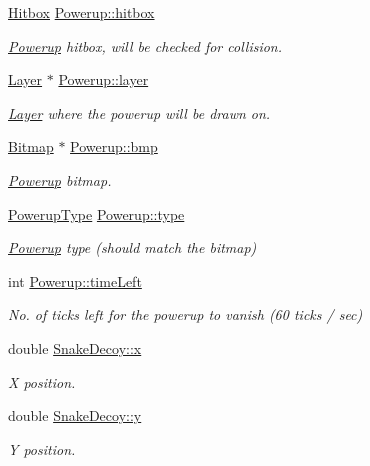 \begin{DoxyCompactItemize}
\mbox{\hyperlink{struct_hitbox}{Hitbox}} \mbox{\hyperlink{group__snake_ga0ec1e0954c1802c16b49ff5833146f32}{Powerup\+::hitbox}}
\begin{DoxyCompactList}\small\item\em \mbox{\hyperlink{struct_powerup}{Powerup}} hitbox, will be checked for collision. \end{DoxyCompactList}\item 
\mbox{\hyperlink{struct_layer}{Layer}} $\ast$ \mbox{\hyperlink{group__snake_ga02754983ce605c249985e650d5023797}{Powerup\+::layer}}
\begin{DoxyCompactList}\small\item\em \mbox{\hyperlink{struct_layer}{Layer}} where the powerup will be drawn on. \end{DoxyCompactList}\item 
\mbox{\hyperlink{struct_bitmap}{Bitmap}} $\ast$ \mbox{\hyperlink{group__snake_ga13efa83c1c0242d50ed4a18a6cdc77af}{Powerup\+::bmp}}
\begin{DoxyCompactList}\small\item\em \mbox{\hyperlink{struct_powerup}{Powerup}} bitmap. \end{DoxyCompactList}\item 
\mbox{\hyperlink{group__snake_gad58f93a5af4c0698fd0b903516c57c31}{Powerup\+Type}} \mbox{\hyperlink{group__snake_gaddc7f76821bf2505d35b85d3cf725a16}{Powerup\+::type}}
\begin{DoxyCompactList}\small\item\em \mbox{\hyperlink{struct_powerup}{Powerup}} type (should match the bitmap) \end{DoxyCompactList}\item 
int \mbox{\hyperlink{group__snake_ga2de87d12a63bc12e8738adcada2d4ae4}{Powerup\+::time\+Left}}
\begin{DoxyCompactList}\small\item\em No. of ticks left for the powerup to vanish (60 ticks / sec) \end{DoxyCompactList}\item 
double \mbox{\hyperlink{group__snake_ga6245e649ad55ae856c956d31a1a4d2e5}{Snake\+Decoy\+::x}}
\begin{DoxyCompactList}\small\item\em X position. \end{DoxyCompactList}\item 
double \mbox{\hyperlink{group__snake_gad6c137495e858da565b3d7af5c8a480e}{Snake\+Decoy\+::y}}
\begin{DoxyCompactList}\small\item\em Y position. \end{DoxyCompactList}\item 

\end{DoxyCompactItemize}
